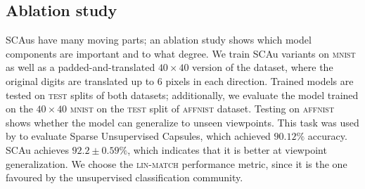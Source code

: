 \subsection{Ablation study}
\label{sec:ablation}
\gls{SCAu}s have many moving parts;
an ablation study shows which model components are important and to what degree.
We train \gls{SCAu} variants on \textsc{mnist} as well as a padded-and-translated $40\times40$ version of the dataset, where the original digits are translated up to 6 pixels in each direction.
Trained models are tested on \textsc{test} splits of both datasets; additionally, we evaluate the model trained on the $40\times40$ \textsc{mnist} on the \textsc{test} split of \textsc{affnist} dataset.
Testing on \textsc{affnist} shows whether the model can generalize to unseen viewpoints.
This task was used by \cite{Rawlinson2018sparsecaps} to evaluate Sparse Unsupervised Capsules, which achieved $90.12\%$ accuracy. \Gls{SCAu} achieves $92.2\pm 0.59\%$, which indicates that it is better at viewpoint generalization.
We choose the \textsc{lin-match} performance metric, since it is the one favoured by the unsupervised classification community.
